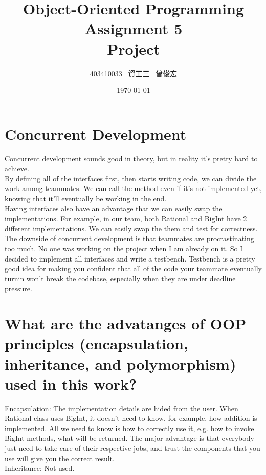 \documentclass[12pt, A4]{article}
\title{Object-Oriented Programming\\ Assignment 5\\ Project}
\author{403410033 \ 資工三 \ 曾俊宏}
\date{\today}
\begin{document}
	
	\maketitle

    \section{Concurrent Development}
    
    Concurrent development sounds good in theory, but in reality it's pretty hard to achieve.\\
    
    By defining all of the interfaces first, then starts writing code, we can divide the work among teammates. We can call the method even if it's not implemented yet, knowing that it'll eventually be working in the end.\\
    
    Having interfaces also have an advantage that we can easily swap the implementations. For example, in our team, both Rational and BigInt have 2 different implementations. We can easily swap the them and test for correctness.\\
    
    The downside of concurrent development is that teammates are procrastinating too much. No one was working on the project when I am already on it. So I decided to implement all interfaces and write a testbench. Testbench is a pretty good idea for making you confident that all of the code your teammate eventually turnin won't break the codebase, especially when they are under deadline pressure.
    
    \section{What are the advatanges of OOP principles (encapsulation, inheritance, and polymorphism) used in this work?}
    
    Encapsulation: The implementation details are hided from the user. When Rational class uses BigInt, it doesn't need to know, for example, how addition is implemented. All we need to know is how to correctly use it, e.g. how to invoke BigInt methods, what will be returned. The major advantage is that everybody just need to take care of their respective jobs, and trust the components that you use will give you the correct result.\\
    
    Inheritance: Not used.\\
    
\end{document}
